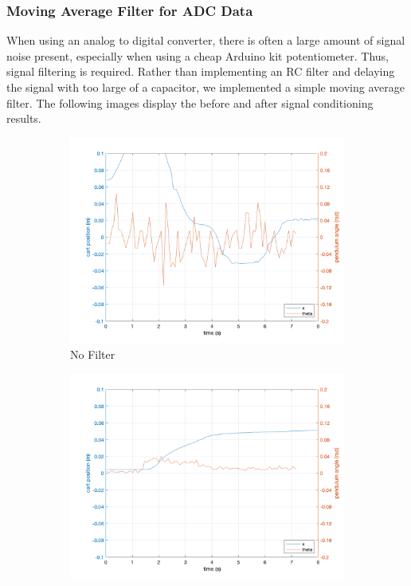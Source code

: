 \documentclass[12pt]{article}
\begin{document}
\subsubsection{Moving Average Filter for ADC Data}
When using an analog to digital converter, there is often a large amount of signal noise present, especially when using a cheap Arduino kit potentiometer. Thus, signal filtering is required. Rather than implementing an RC filter and delaying the signal with too large of a capacitor, we implemented a simple moving average filter. The following images display the before and after signal conditioning results.
\begin{figure}[H]
    \centering
    \begin{subfigure}{.32\textwidth}
      \centering
      \includegraphics[width=1\linewidth]{figures/noAvg.png}
      \caption{No Filter}
    \end{subfigure}
    \begin{subfigure}{.32\textwidth}
      \centering
      \includegraphics[width=1\linewidth]{figures/movAvg10.png}

\end{subfigure}
\end{figure}
\end{document}
